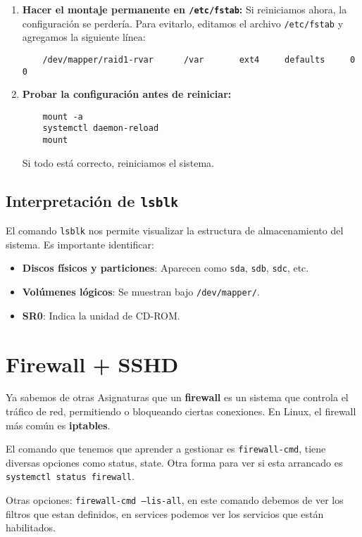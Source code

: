\begin{enumerate}
    \item \textbf{Hacer el montaje permanente en \texttt{/etc/fstab}:}  
    Si reiniciamos ahora, la configuración se perdería. Para evitarlo, editamos el archivo \texttt{/etc/fstab} y agregamos la siguiente línea:
    \begin{verbatim}
    /dev/mapper/raid1-rvar      /var       ext4     defaults     0 0
    \end{verbatim}
    
    \item \textbf{Probar la configuración antes de reiniciar:}  
    \begin{verbatim}
    mount -a
    systemctl daemon-reload
    mount
    \end{verbatim}
    Si todo está correcto, reiniciamos el sistema.
\end{enumerate}

\subsection{Interpretación de \texttt{lsblk}}

El comando \texttt{lsblk} nos permite visualizar la estructura de almacenamiento del sistema. Es importante identificar:

\begin{itemize}
    \item \textbf{Discos físicos y particiones}: Aparecen como \texttt{sda}, \texttt{sdb}, \texttt{sdc}, etc.
    \item \textbf{Volúmenes lógicos}: Se muestran bajo \texttt{/dev/mapper/}.
    \item \textbf{SR0}: Indica la unidad de CD-ROM.
\end{itemize}


\section{Firewall + SSHD}

Ya sabemos de otras Asignaturas que un \textbf{firewall} es un sistema que controla el tráfico de red, permitiendo o bloqueando ciertas conexiones. En Linux, el firewall más común es \textbf{iptables}.

El comando que tenemos que aprender a gestionar es \texttt{firewall-cmd}, tiene diversas opciones como status, state. Otra forma para ver si esta arrancado es \texttt{systemctl status firewall}.

Otras opciones: \texttt{firewall-cmd --lis-all}, en este comando debemos de ver los filtros que estan definidos, en services podemos ver los servicios que están habilitados.

